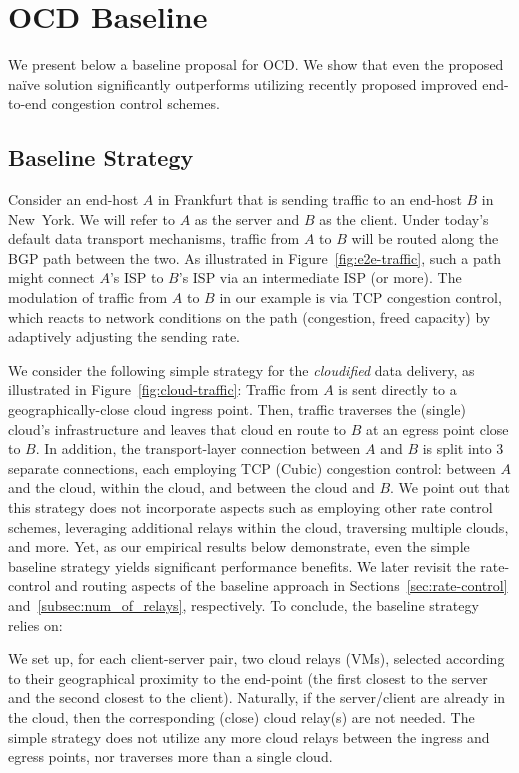 \documentclass[newfonts=false,format=sigconf,10pt,letterpaper]{acmart}
\begin{document}
\section{OCD Baseline
}\label{sec:ocd-baseline}

We present below a baseline proposal for OCD. We show that even the proposed na\"ive solution significantly outperforms utilizing recently proposed improved end-to-end congestion control schemes.

\subsection{Baseline Strategy}

Consider an end-host $A$ in Frankfurt that is sending traffic to an end-host $B$ in New~York. We will refer to $A$ as the server and $B$ as the client. Under today's default data transport mechanisms, traffic from $A$ to $B$ will be routed along the BGP path between the two. As illustrated in Figure~\ref{fig:e2e-traffic}, such a path might connect $A$'s ISP to $B$'s ISP via an intermediate ISP (or more). The modulation of traffic from $A$ to $B$ in our example is via TCP congestion control, which reacts to network conditions on the path (congestion, freed capacity) by adaptively adjusting the sending rate.        

We consider the following simple strategy for the \textit{cloudified} data delivery,
as illustrated in Figure~\ref{fig:cloud-traffic}: Traffic from $A$ is sent
directly to a geographically-close cloud ingress point. Then, traffic traverses the (single) cloud's infrastructure and leaves that cloud en
route to $B$ at an egress point close to $B$. In addition, the
transport-layer connection between $A$ and $B$ is split into $3$ separate connections, each employing TCP (Cubic) congestion
control: between $A$ and the cloud, within the cloud, and between the cloud and
$B$. We point out that this strategy does not incorporate aspects
such as employing other rate control schemes, leveraging additional relays
within the cloud, traversing multiple clouds, and more. Yet, as our empirical
results below demonstrate, even the simple baseline strategy yields significant
performance benefits. We later revisit the rate-control and routing aspects of the baseline approach in Sections~\ref{sec:rate-control} and~\ref{subsec:num_of_relays}, respectively.
To conclude, the baseline strategy relies on:

\vspace{0.1in} We set up, for each client-server pair, two cloud relays (VMs), selected according to their geographical proximity to the end-point (the first closest to the server and the second closest to the client). Naturally, if the server/client are already in the cloud, then the corresponding (close) cloud relay(s) are not needed. The simple strategy does not utilize any more cloud relays between the ingress and egress points, nor traverses more than a single cloud.
\end{document}
